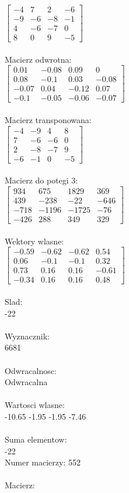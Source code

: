 \documentclass[a4paper,12pt]{article}
\begin{document}
$\begin{bmatrix} -4&7&2&-6\\-9&-6&-8&-1\\4&-6&-7&0\\8&0&9&-5 \end{bmatrix}$
\\
\\
Macierz odwrotna:\\

$\begin{bmatrix} 0.01&-0.08&0.09&0\\0.08&-0.1&0.03&-0.08\\-0.07&0.04&-0.12&0.07\\-0.1&-0.05&-0.06&-0.07 \end{bmatrix}$
\\
\\
Macierz transponowana:\\

$\begin{bmatrix} -4&-9&4&8\\7&-6&-6&0\\2&-8&-7&9\\-6&-1&0&-5 \end{bmatrix}$
\\
\\
Macierz do potegi 3:\\

$\begin{bmatrix} 934&675&1829&369\\439&-238&-22&-646\\-718&-1196&-1725&-76\\-426&288&349&329 \end{bmatrix}$
\\
\\
Wektory wlasne:\\

$\begin{bmatrix} -0.59&-0.62&-0.62&0.54\\0.06&-0.1&-0.1&0.32\\0.73&0.16&0.16&-0.61\\-0.34&0.16&0.16&0.48 \end{bmatrix}$
\\
\\
Slad:\\
-22
\\
\\
Wyznacznik:\\
6681
\\
\\
Odwracalnosc:\\
Odwracalna
\\
\\
Wartosci wlasne:\\
-10.65 -1.95 -1.95 -7.46
\\
\\
Suma elementow:\\
-22
\\
\newpage
Numer macierzy:
552
\\
\\
Macierz:\\
\end{document}
